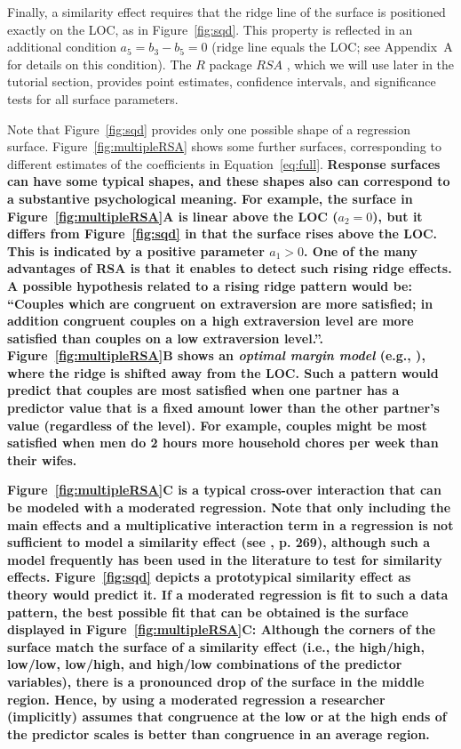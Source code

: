 \documentclass[jou,a4paper,draftfirst]{apa6}
\newcommand{\added}[1]{\textcolor{colour_added}{\bf{#1}}}
\begin{document}
Finally, a similarity effect requires that the ridge line of the surface is positioned exactly on the LOC, as in Figure~\ref{fig:sqd}. This property is reflected in an additional condition $a_5 = b_3 - b_5 = 0$ (ridge line equals the LOC; see Appendix~A for details on this condition). The $R$ package $RSA$ \parencite{schonbrodt_rsa:_2016}, which we will use later in the tutorial section, provides point estimates, confidence intervals, and significance tests for all surface parameters.

Note that Figure~\ref{fig:sqd} provides only one possible shape of a regression surface. Figure~\ref{fig:multipleRSA} shows some further surfaces, corresponding to different estimates of the coefficients in Equation~\ref{eq:full}. \added{Response surfaces can have some typical shapes, and these shapes also can correspond to a substantive psychological meaning. For example, the surface in Figure~\ref{fig:multipleRSA}A is linear above the LOC ($a_2=0$), but it differs from Figure~\ref{fig:sqd} in that the surface rises above the LOC. This is indicated by a positive parameter $a_1 > 0$. One of the many advantages of RSA is that it enables to detect such rising ridge effects. A possible hypothesis related to a rising ridge pattern would be: ``Couples which are congruent on extraversion are more satisfied; in addition congruent couples on a high extraversion level are more satisfied than couples on a low extraversion level.''. 
Figure~\ref{fig:multipleRSA}B shows an \textit{optimal margin model} (e.g., \nptextcite{Baumeister_1989}), where the ridge is shifted away from the LOC. Such a pattern would predict that couples are most satisfied when one partner has a predictor value that is a fixed amount lower than the other partner's value (regardless of the level). For example, couples might be most satisfied when men do 2 hours more household chores per week than their wifes.}

\added{Figure~\ref{fig:multipleRSA}C is a typical cross-over interaction that can be modeled with a moderated regression.
Note that only including the main effects and a multiplicative interaction term in a regression is not sufficient to model a similarity effect (see \nptextcite{Edwards2001}, p. 269), although such a model frequently has been used in the literature to test for similarity effects. Figure~\ref{fig:sqd} depicts a prototypical similarity effect as theory would predict it. If a moderated regression is fit to such a data pattern, the best possible fit that can be obtained is the surface displayed in Figure~\ref{fig:multipleRSA}C: Although the corners of the surface match the surface of a similarity effect (i.e., the high/high, low/low, low/high, and high/low combinations of the predictor variables), there is a pronounced drop of the surface in the middle region. Hence, by using a moderated regression a researcher (implicitly) assumes that congruence at the low or at the high ends of the predictor scales is better than congruence in an average region.}
\end{document}

